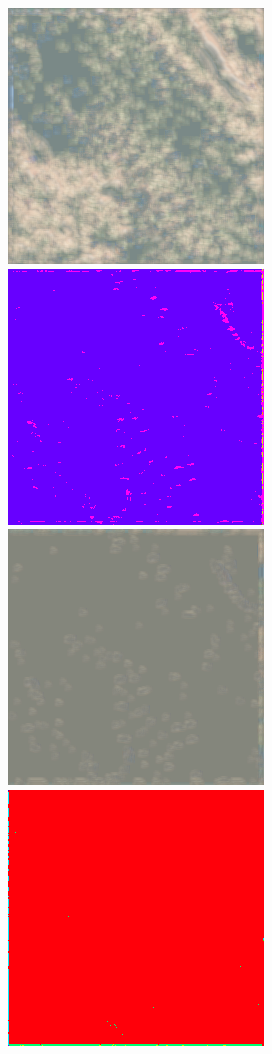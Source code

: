 \begin{figure}
    \includegraphics[width=\WnetPredictionsImageWidth]{images/wnet/46d-6/224817-restored} \hfill
    \includegraphics[width=\WnetPredictionsImageWidth]{images/wnet/36d-20/224817-prediction} \hfill
    \includegraphics[width=\WnetPredictionsImageWidth]{images/wnet/36d-20/224817-restored} \hfill
    \includegraphics[width=\WnetPredictionsImageWidth]{images/wnet/46d-20/224817-prediction} \hfill

\end{figure}
